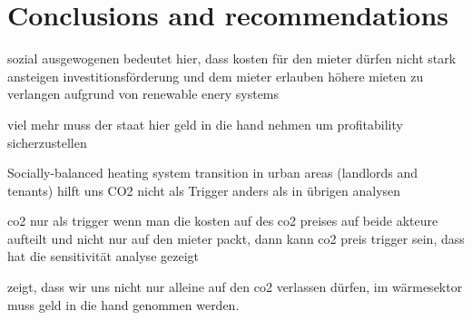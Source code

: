 \section{Conclusions and recommendations}\label{conclusions}


sozial ausgewogenen bedeutet hier, dass kosten für den mieter dürfen nicht stark ansteigen 
investitionsförderung und dem mieter erlauben höhere mieten zu verlangen aufgrund von renewable enery systems


viel mehr muss der staat hier geld in die hand nehmen um profitability sicherzustellen 

Socially-balanced heating system transition in urban areas (landlords and tenants) hilft uns CO2 nicht als Trigger anders als in übrigen analysen

co2 nur als trigger wenn man die kosten auf des co2 preises auf beide akteure aufteilt und nicht nur auf den mieter packt, dann kann co2 preis trigger sein, dass hat die sensitivität analyse gezeigt

zeigt, dass wir uns nicht nur alleine auf den co2 verlassen dürfen, im wärmesektor muss geld in die hand genommen werden. 


